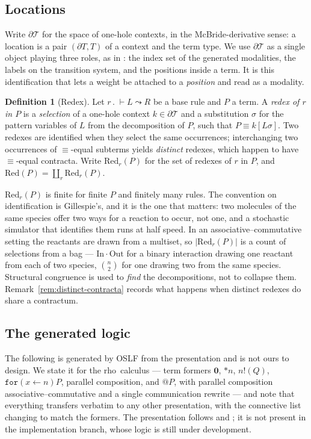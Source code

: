 \documentclass[11pt,a4paper]{article}
\theoremstyle{plain}
\theoremstyle{definition}
\newtheorem{definition}[theorem]{Definition}
\theoremstyle{remark}
\newcommand{\rhoc}{\textsf{rho}}
\newcommand{\Nil}{\mathbf{0}}
\newcommand{\Terms}{\mathcal{T}}
\newcommand{\Red}{\mathrm{Red}}
\begin{document}
\subsection{Locations}

Write $\partial \Terms$ for the space of one-hole contexts, in the McBride-derivative sense: a
location is a pair $(\partial T, T)$ of a context and the term type. We use $\partial \Terms$ as a
single object playing three roles, as in \cite{omnibus}: the index set of the generated modalities,
the labels on the transition system, and the positions inside a term. It is this identification that
lets a weight be attached to a \emph{position} and read as a modality.

\begin{definition}[Redex]
\label{def:redex}
Let $r \,.\; \vdash L \leadsto R$ be a base rule and $P$ a term. A \emph{redex of $r$ in $P$} is a
\emph{selection} of a one-hole context $k \in \partial\Terms$ and a substitution $\sigma$ for the
pattern variables of $L$ from the decomposition of $P$, such that $P \equiv k[L\sigma]$. Two redexes
are identified when they select the same occurrences; interchanging two occurrences of
$\equiv$-equal subterms yields \emph{distinct} redexes, which happen to have $\equiv$-equal
contracta. Write $\Red_r(P)$ for the set of redexes of $r$ in $P$, and
$\Red(P) = \coprod_r \Red_r(P)$.
\end{definition}

$\Red_r(P)$ is finite for finite $P$ and finitely many rules. The convention on identification is
Gillespie's, and it is the one that matters: two molecules of the same species offer two ways for a
reaction to occur, not one, and a stochastic simulator that identifies them runs at half speed. In
an associative--commutative setting the reactants are drawn from a multiset, so $|\Red_r(P)|$ is a
count of selections from a bag --- $\mathrm{In}\cdot\mathrm{Out}$ for a binary interaction drawing
one reactant from each of two species, $\binom{n}{2}$ for one drawing two from the same species.
Structural congruence is used to \emph{find} the decompositions, not to collapse them.
Remark~\ref{rem:distinct-contracta} records what happens when distinct redexes do share a contractum.

\subsection{The generated logic}
\label{sec:logic}

The following is generated by OSLF from the presentation and is not ours to design. We state it for
the \rhoc\ calculus --- term formers $\Nil$, $*n$, $n!(Q)$, $\texttt{for}(x \leftarrow n)P$,
parallel composition, and $@P$, with parallel composition associative--commutative and a single
communication rewrite --- and note that everything transfers verbatim to any other presentation,
with the connective list changing to match the formers. The presentation follows
\cite[\S2]{classifier} and \cite[\S3]{scientist}; it is not present in the implementation branch,
whose logic is still under development.
\end{document}
